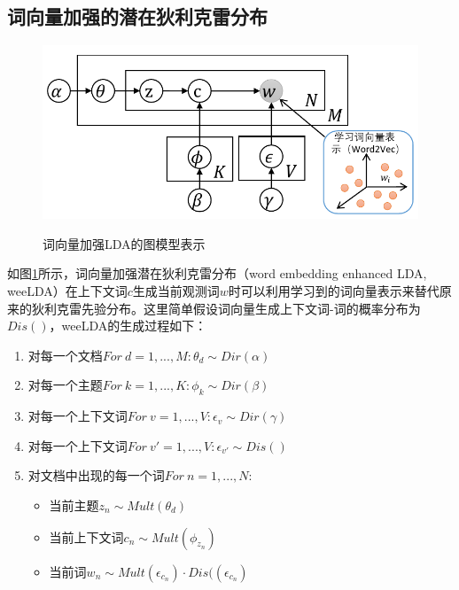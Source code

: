 \documentclass[master]{njuthesis}
\begin{document}
\subsection{词向量加强的潜在狄利克雷分布}\label{subsec_enhanced_lda_chap5}
 
\begin{figure}[htbp]
\centering
\includegraphics[width= 1.0\textwidth]{figures//weeLDA_chap5.pdf}\\
\caption{词向量加强LDA的图模型表示}\label{fig:weeLDA_chap5}
\end{figure}

如图\ref{fig:weeLDA_chap5}所示，词向量加强潜在狄利克雷分布（word embedding enhanced LDA, weeLDA）在上下文词$c$生成当前观测词$w$时可以利用学习到的词向量表示来替代原来的狄利克雷先验分布。这里简单假设词向量生成上下文词-词的概率分布为$Dis()$，weeLDA的生成过程如下：
	\begin{enumerate}
	\item 对每一个文档$For\ d=1, ..., M: \theta_{d}\sim Dir(\alpha)$
	\item 对每一个主题$For\ k=1, ..., K: \phi_{k}\sim Dir(\beta)$
	\item 对每一个上下文词$For\ v=1, ..., V: \epsilon_{v}\sim Dir(\gamma)$
	\item 对每一个上下文词$For\ v'=1, ..., V: \epsilon_{v'}\sim Dis()$
	\item 对文档中出现的每一个词$For\ n=1, ..., N:$
		\begin{itemize}
		\item 当前主题$z_{n}\sim Mult(\theta_{d})$
		\item 当前上下文词$c_{n}\sim Mult(\phi_{z_{n}})$
		\item 当前词$w_{n}\sim Mult(\epsilon_{c_{n}}) \cdot Dis((\epsilon_{c_{n}})$
		\end{itemize}
	\end{enumerate}
	
\end{document}
